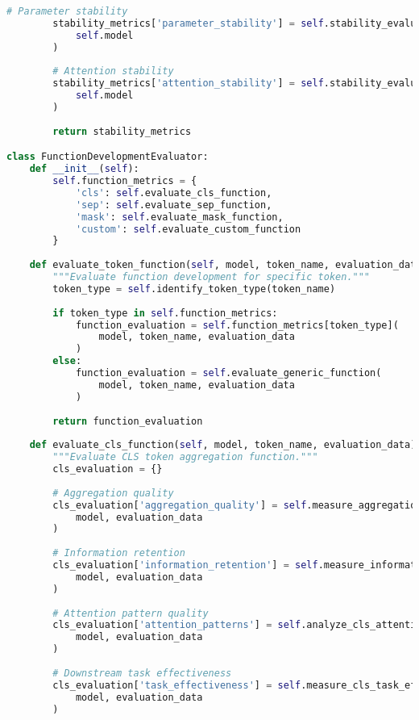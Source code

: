\begin{lstlisting}[language=Python, caption=Comprehensive evaluation metrics framework for special token training]
        # Parameter stability
        stability_metrics['parameter_stability'] = self.stability_evaluator.evaluate_parameter_stability(
            self.model
        )
        
        # Attention stability
        stability_metrics['attention_stability'] = self.stability_evaluator.evaluate_attention_stability(
            self.model
        )
        
        return stability_metrics

class FunctionDevelopmentEvaluator:
    def __init__(self):
        self.function_metrics = {
            'cls': self.evaluate_cls_function,
            'sep': self.evaluate_sep_function,
            'mask': self.evaluate_mask_function,
            'custom': self.evaluate_custom_function
        }
    
    def evaluate_token_function(self, model, token_name, evaluation_data):
        """Evaluate function development for specific token."""
        token_type = self.identify_token_type(token_name)
        
        if token_type in self.function_metrics:
            function_evaluation = self.function_metrics[token_type](
                model, token_name, evaluation_data
            )
        else:
            function_evaluation = self.evaluate_generic_function(
                model, token_name, evaluation_data
            )
        
        return function_evaluation
    
    def evaluate_cls_function(self, model, token_name, evaluation_data):
        """Evaluate CLS token aggregation function."""
        cls_evaluation = {}
        
        # Aggregation quality
        cls_evaluation['aggregation_quality'] = self.measure_aggregation_quality(
            model, evaluation_data
        )
        
        # Information retention
        cls_evaluation['information_retention'] = self.measure_information_retention(
            model, evaluation_data
        )
        
        # Attention pattern quality
        cls_evaluation['attention_patterns'] = self.analyze_cls_attention_patterns(
            model, evaluation_data
        )
        
        # Downstream task effectiveness
        cls_evaluation['task_effectiveness'] = self.measure_cls_task_effectiveness(
            model, evaluation_data
        )
        

\end{lstlisting}
